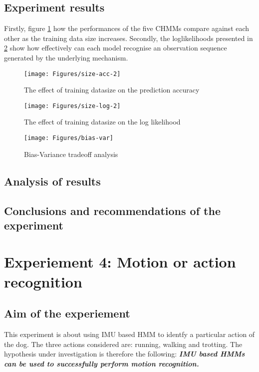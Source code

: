 \subsection{Experiment results}
Firstly, figure \ref{fig:size-acc} how the performances of the five CHMMs compare against each other as the training data size increases.
Secondly, the loglikelihoods presented in \ref{fig:size-log} show how effectively can each model recognise an observation sequence generated by the underlying mechanism.

\begin{figure}[ht!]
	\texttt{[image: Figures/size-acc-2]}
	\caption{The effect of training datasize on the prediction accuracy}
	\label{fig:size-acc}
\end{figure}

\begin{figure}[ht!]
	\texttt{[image: Figures/size-log-2]}
	\caption{The effect of training datasize on the log likelihood}
	\label{fig:size-log}
\end{figure}

\begin{figure}[ht!]
	\centering
	\texttt{[image: Figures/bias-var]}
	\caption{Bias-Variance tradeoff analysis}
	\label{fig:bias-var}
\end{figure}



\subsection{Analysis of results}

\subsection{Conclusions and recommendations of the experiment}

\section{Experiement 4: Motion or action recognition}  \label{exp:motion}

\subsection{Aim of the experiement}
This experiment is about using IMU based HMM to identfy a particular action of the dog. The three actions considered are: running, walking and trotting.
The hypothesis under investigation is therefore the following:
\textbf{\textit{IMU based HMMs can be used to successfully perform motion recognition.}}

